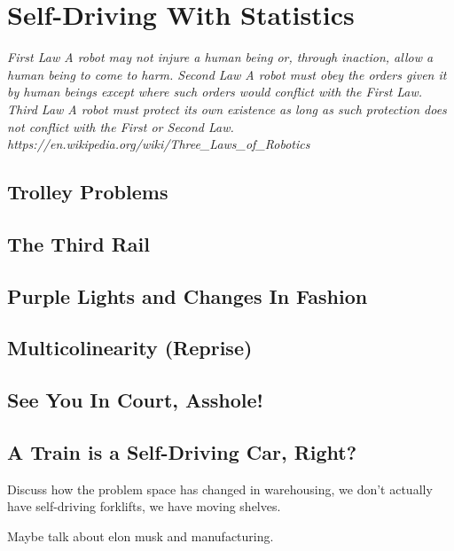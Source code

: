 \setchapterpreamble[u]{\margintoc}
\chapter{Self-Driving With Statistics}

\textit{First Law
A robot may not injure a human being or, through inaction, allow a human being to come to harm.
Second Law
A robot must obey the orders given it by human beings except where such orders would conflict with the First Law.
Third Law
A robot must protect its own existence as long as such protection does not conflict with the First or Second Law. https://en.wikipedia.org/wiki/Three_Laws_of_Robotics} 



\section{Trolley Problems}

\section{The Third Rail}

\section{Purple Lights and Changes In Fashion}

\section{Multicolinearity (Reprise)}

\section{See You In Court, Asshole!}

\section{A Train is a Self-Driving Car, Right?}

Discuss how the problem space has changed in warehousing, we don't actually have self-driving forklifts, we have moving shelves.

Maybe talk about elon musk and manufacturing.
